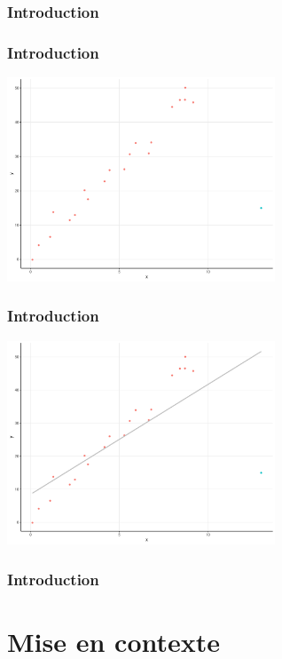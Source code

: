 \documentclass{beamer}
\begin{document}
	\begin{frame}
		\frametitle{Introduction}
		{\footnotesize }
	\end{frame}

	\begin{frame}
		\frametitle{Introduction}
		\centering
		\includegraphics[width=8cm]{images/plot3}
	\end{frame}
	
	\begin{frame}
		\frametitle{Introduction}
		\centering
		\includegraphics[width=8cm]{images/plot4}
	\end{frame}
	
	\begin{frame}
		\frametitle{Introduction}
		{\footnotesize }
	\end{frame}
	
	\section{Mise en contexte}
	
\end{document}
